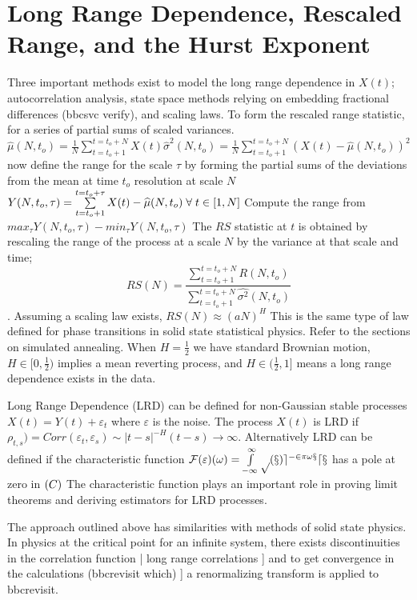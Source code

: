 \section{Long Range Dependence, Rescaled Range,  and the Hurst
Exponent} Three important methods exist to model the long range
dependence in $X(t)$; autocorrelation analysis, state space
methods relying on embedding fractional differences (bbcsvc
verify), and scaling laws.  To form the rescaled range
statistic, for a series of partial sums of scaled variances.
$\widehat{\mu}(N,t_o) = \frac{1}{N} \sum
\limits_{t=t_o+1}^{t=t_o+N} X(t) \widehat{\sigma}^{2}(N,t_o)=
\frac{1}{N} \sum\limits_{t=t_o+1}^{t=t_o+N} ( X(t) -
\widehat{\mu}(N,t_o))^{2} $ now define the range for the scale
$\tau$ by forming the partial sums of the deviations from the
mean at time $t_o$ resolution at scale $N$
$Y(N,t_o,\tau)=\sum \limits_{t=t_o+1}^{t=t_o+\tau}
X(t)-\widehat{\mu}(N,t_o) \; \forall \; t \in [1,N]$ Compute the range
from $max_{\tau}Y(N,t_o,\tau)-min_{\tau} Y(N,t_o,\tau)$ The
$RS$ statistic at $t$ is obtained by rescaling the range of the
process at a scale $N$ by the variance  at that scale and time;
\begin{equation}\label{0.1}  RS(N) =  \frac{\sum
\limits_{t=t_o+1}^{t=t_o+N}R(N,t_o)}{\sum
\limits_{t=t_o+1}^{t=t_o+N} \widehat{\sigma^{2}}(N,t_o)}
\end{equation}. Assuming a scaling law exists, $RS(N)\approx
(aN)^{H}$  This is the same type of law defined for phase
transitions in solid state statistical physics.  Refer to the
sections on simulated annealing.  When $H=\frac{1}{2}$ we have
standard Brownian motion, $H \in [0, \frac{1}{2})$ implies a
mean reverting process, and $ H \in (\frac{1}{2},1]$ means a
long range dependence exists in the data.

Long Range Dependence (LRD) can be defined for non-Gaussian
stable processes $X(t)= Y(t) + \varepsilon_t$ where
$\varepsilon$ is the noise.  The process $X(t)$ is LRD if
$\rho_{t,s})=Corr(\varepsilon_t, \varepsilon_s) \sim |t-s|^{-H}
(t-s) \rightarrow \infty$.  Alternatively LRD can be defined if
the characteristic function $ \cal{F}(\varepsilon)(\omega) =
\int \limits_{- \infty}^{\infty} p(x) e^{-2 \pi \omega x} dx$
has a pole at zero in $\mathbb{(}C)$  The characteristic function
plays an important role in proving limit theorems and deriving
estimators for LRD processes.

The approach outlined above has  similarities with methods of
solid state physics. In physics at the critical point for an
infinite system, there exists discontinuities in the
correlation function | long range correlations ] and to get
convergence in the calculations (bbcrevisit which) ] a
renormalizing transform is applied to bbcrevisit.

